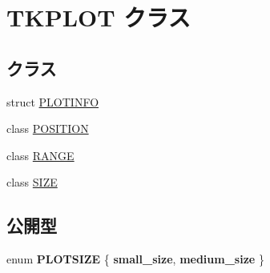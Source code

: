 \hypertarget{class_t_k_p_l_o_t}{}\section{T\+K\+P\+L\+OT クラス}
\label{class_t_k_p_l_o_t}
\subsection*{クラス}
\begin{DoxyCompactItemize}
\item 
struct \hyperlink{struct_t_k_p_l_o_t_1_1_p_l_o_t_i_n_f_o}{P\+L\+O\+T\+I\+N\+FO}
\item 
class \hyperlink{class_t_k_p_l_o_t_1_1_p_o_s_i_t_i_o_n}{P\+O\+S\+I\+T\+I\+ON}
\item 
class \hyperlink{class_t_k_p_l_o_t_1_1_r_a_n_g_e}{R\+A\+N\+GE}
\item 
class \hyperlink{class_t_k_p_l_o_t_1_1_s_i_z_e}{S\+I\+ZE}
\end{DoxyCompactItemize}
\subsection*{公開型}
\begin{DoxyCompactItemize}
\item 
\mbox{\label{class_t_k_p_l_o_t_a158082ae168750554cf23edde9a27416}} 
enum {\bfseries P\+L\+O\+T\+S\+I\+ZE} \{ {\bfseries small\+\_\+size}, 
{\bfseries medium\+\_\+size}
 \}
\end{DoxyCompactItemize}
